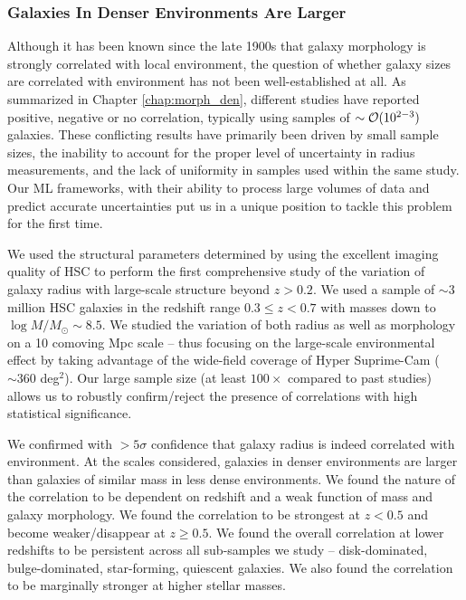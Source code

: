 \subsubsection{Galaxies In Denser Environments Are Larger} \label{sec_conc:morph_den} 

Although it has been known since the late 1900s that galaxy morphology is strongly correlated with local environment, the question of whether galaxy sizes are correlated with environment has not been well-established at all. As summarized in Chapter \ref{chap:morph_den}, different studies have reported positive, negative or no correlation, typically using samples of $\sim \mathcal{O}(10^{2-3})$ galaxies. These conflicting results have primarily been driven by small sample sizes, the inability to account for the proper level of uncertainty in radius measurements, and the lack of uniformity in samples used within the same study. Our ML frameworks, with their ability to process large volumes of data and predict accurate uncertainties put us in a unique position to tackle this problem for the first time. 

We used the structural parameters determined by \gampen{} using the excellent imaging quality of HSC to perform the first comprehensive study of the variation of galaxy radius with large-scale structure beyond $z > 0.2$. We used a sample of $\sim3$ million HSC galaxies in the redshift range $0.3 \leq z < 0.7$ with masses down to $\log M/M_{\odot}\sim8.5$. We studied the variation of both radius as well as morphology on a 10 comoving Mpc scale -- thus focusing on the large-scale environmental effect by taking advantage of the wide-field coverage of Hyper Suprime-Cam ($\sim 360$ deg$^2$). Our large sample size (at least $100\times$ compared to past studies) allows us to robustly confirm/reject the presence of correlations with high statistical significance. 

We confirmed with $>5\sigma$ confidence that galaxy radius is indeed correlated with environment. At the scales considered, galaxies in denser environments are larger than galaxies of similar mass in less dense environments. We found the nature of the correlation to be dependent on redshift and a weak function of mass and galaxy morphology. We found the correlation to be strongest at $z < 0.5$ and become weaker/disappear at $z \geq 0.5$. We found the overall correlation at lower redshifts to be persistent across all sub-samples we study -- disk-dominated, bulge-dominated, star-forming, quiescent galaxies. We also found the correlation to be marginally stronger at higher stellar masses. 

